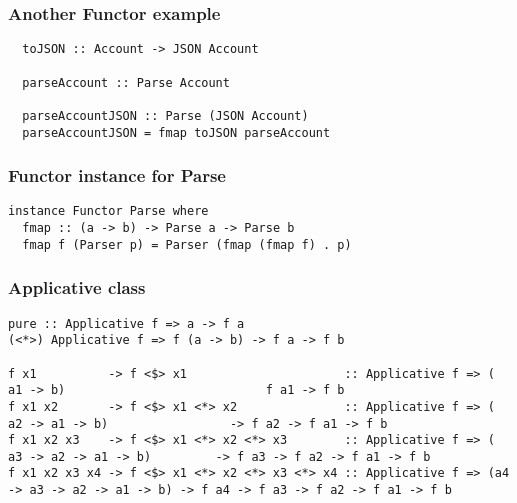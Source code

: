 \documentclass{beamer}
\begin{document}
\begin{frame}
\frametitle{Another Functor example}

\begin{lstlisting}
  toJSON :: Account -> JSON Account

  parseAccount :: Parse Account

  parseAccountJSON :: Parse (JSON Account)
  parseAccountJSON = fmap toJSON parseAccount
\end{lstlisting}

\end{frame}


\begin{frame}
\frametitle{Functor instance for Parse}

\begin{lstlisting}
instance Functor Parse where
  fmap :: (a -> b) -> Parse a -> Parse b
  fmap f (Parser p) = Parser (fmap (fmap f) . p)
\end{lstlisting}


\end{frame}




\begin{frame}
\frametitle{Applicative class}

\begin{lstlisting}
pure :: Applicative f => a -> f a
(<*>) Applicative f => f (a -> b) -> f a -> f b

f x1          -> f <$> x1                      :: Applicative f => (                  a1 -> b)                            f a1 -> f b
f x1 x2       -> f <$> x1 <*> x2               :: Applicative f => (            a2 -> a1 -> b)                 -> f a2 -> f a1 -> f b
f x1 x2 x3    -> f <$> x1 <*> x2 <*> x3        :: Applicative f => (      a3 -> a2 -> a1 -> b)         -> f a3 -> f a2 -> f a1 -> f b
f x1 x2 x3 x4 -> f <$> x1 <*> x2 <*> x3 <*> x4 :: Applicative f => (a4 -> a3 -> a2 -> a1 -> b) -> f a4 -> f a3 -> f a2 -> f a1 -> f b
\end{lstlisting}

\end{frame}
\end{document}
